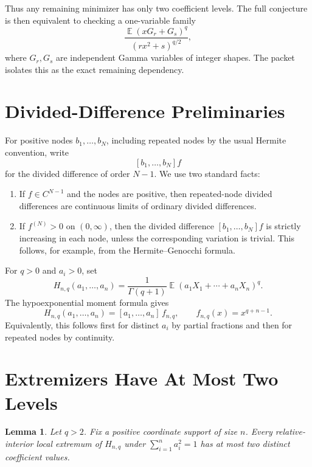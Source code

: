 \documentclass[11pt]{amsart}
\newtheorem{lemma}{Lemma}
\DeclareMathOperator{\E}{\mathbb E}
\begin{document}
Thus any remaining minimizer has only two coefficient levels.  The full
conjecture is then equivalent to checking a one-variable family
\[
  \frac{\E(xG_r+G_s)^q}{(rx^2+s)^{q/2}},
\]
where \(G_r,G_s\) are independent Gamma variables of integer shapes.  The
packet isolates this as the exact remaining dependency.

\section*{Divided-Difference Preliminaries}

For positive nodes \(b_1,\ldots,b_N\), including repeated nodes by the usual
Hermite convention, write
\[
  [b_1,\ldots,b_N]f
\]
for the divided difference of order \(N-1\).  We use two standard facts:

\begin{enumerate}
\item If \(f\in C^{N-1}\) and the nodes are positive, then repeated-node
divided differences are continuous limits of ordinary divided differences.
\item If \(f^{(N)}>0\) on \((0,\infty)\), then the divided difference
\([b_1,\ldots,b_N]f\) is strictly increasing in each node, unless the
corresponding variation is trivial.  This follows, for example, from the
Hermite--Genocchi formula.
\end{enumerate}

For \(q>0\) and \(a_i>0\), set
\[
  H_{n,q}(a_1,\ldots,a_n)
  =\frac{1}{\Gamma(q+1)}
    \E(a_1X_1+\cdots+a_nX_n)^q .
\]
The hypoexponential moment formula gives
\[
  H_{n,q}(a_1,\ldots,a_n)
  =[a_1,\ldots,a_n]\, f_{n,q},
  \qquad
  f_{n,q}(x)=x^{q+n-1}.
\]
Equivalently, this follows first for distinct \(a_i\) by partial fractions
and then for repeated nodes by continuity.

\section*{Extremizers Have At Most Two Levels}

\begin{lemma}
Let \(q>2\).  Fix a positive coordinate support of size \(n\).  Every
relative-interior local extremum of \(H_{n,q}\) under
\(\sum_{i=1}^n a_i^2=1\) has at most two distinct coefficient values.
\end{lemma}
\end{document}
